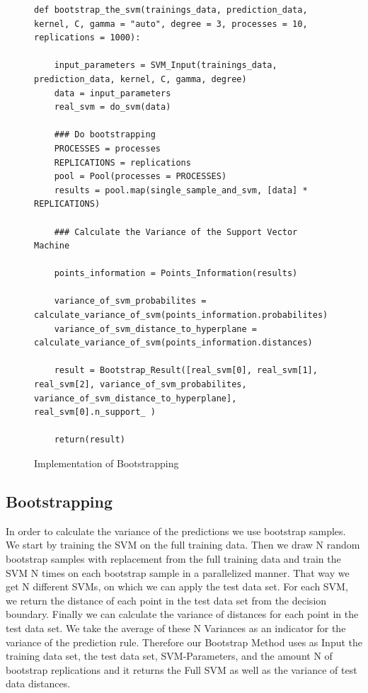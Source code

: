 \documentclass[a4paper]{article}
\begin{document}
\begin{figure}[!htb]
\begin{center}
\begin{lstlisting}
def bootstrap_the_svm(trainings_data, prediction_data, kernel, C, gamma = "auto", degree = 3, processes = 10, replications = 1000):

    input_parameters = SVM_Input(trainings_data, prediction_data, kernel, C, gamma, degree)
    data = input_parameters
    real_svm = do_svm(data)
    
    ### Do bootstrapping
    PROCESSES = processes
    REPLICATIONS = replications
    pool = Pool(processes = PROCESSES)
    results = pool.map(single_sample_and_svm, [data] * REPLICATIONS)
        
    ### Calculate the Variance of the Support Vector Machine
    
    points_information = Points_Information(results)
    
    variance_of_svm_probabilites = calculate_variance_of_svm(points_information.probabilites)
    variance_of_svm_distance_to_hyperplane = calculate_variance_of_svm(points_information.distances)
    
    result = Bootstrap_Result([real_svm[0], real_svm[1], real_svm[2], variance_of_svm_probabilites, variance_of_svm_distance_to_hyperplane], real_svm[0].n_support_ )
        
    return(result)
\end{lstlisting}
\caption{Implementation of Bootstrapping}
\label{fig1}
\end{center}
\end{figure}
\subsection{Bootstrapping}
In order to calculate the variance of the predictions we use bootstrap samples. We start by training the SVM on the full training data. Then we draw N random bootstrap samples with replacement from the full training data and train the SVM N times on each bootstrap sample in a parallelized manner. That way we get N different SVMs, on which we can apply the test data set. For each SVM, we return the distance of each point in the test data set from the decision boundary.  Finally we can calculate the variance of distances for each point in the test data set. We take the average of these N Variances as an indicator for the variance of the prediction rule. Therefore our Bootstrap Method uses as Input the training data set, the test data set, SVM-Parameters, and the amount N of bootstrap replications and it returns the Full SVM as well as the variance of test data distances.
\end{document}
